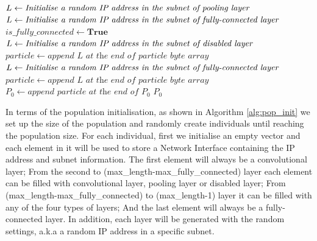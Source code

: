\documentclass[conference]{IEEEtran}
\begin{document}
\begin{algorithm}
\begin{algorithmic}
						\STATE $L \leftarrow \textit{Initialise a random IP address } \newline \textit{in the subnet of pooling layer}$
						\STATE $L \leftarrow \textit{Initialise a random IP address } \newline \textit{in the subnet of fully-connected layer}$
						\STATE $is\_fully\_connected \leftarrow \textbf{True}$
					\ELSE
						\STATE $L \leftarrow \textit{Initialise a random IP address } \newline \textit{in the subnet of disabled layer}$
					\ENDIF
				\ENDIF
				\STATE $particle \leftarrow \textit{append L at the end of particle byte array}$
			\ENDWHILE
			\STATE $L \leftarrow \textit{Initialise a random IP address in the subnet of } \newline \textit{fully-connected layer}$
			\STATE $particle \leftarrow \textit{append L at the end of particle byte array}$
			\STATE $P_{0} \leftarrow \textit{append particle at the end of }P_{0}$
		\ENDWHILE
		\RETURN $P_{0}$
	\end{algorithmic}
\end{algorithm}

In terms of the population initialisation, as shown in Algorithm \ref{alg:pop_init} we set up the size of the population and randomly create individuals until reaching the population size. 
For each individual, first we initialise an empty vector and each element in it will be used to store a Network Interface containing the IP address and subnet information. The first element will always be a convolutional layer; From the second to (max\_length-max\_fully\_connected) layer each element can be filled with convolutional layer, pooling layer or disabled layer; From (max\_length-max\_fully\_connected) to (max\_length-1) layer it can be filled with any of the four types of layers; And the last element will always be a fully-connected layer. In addition, each layer will be generated with the random settings, a.k.a a random IP address in a specific subnet.
\end{document}
